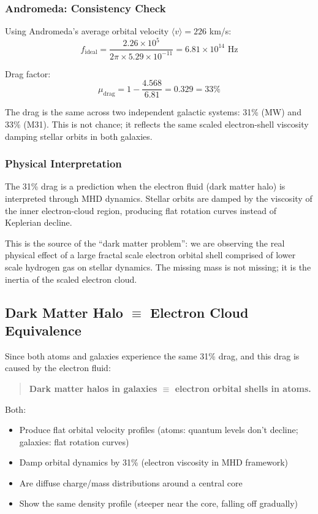 \documentclass[11pt,a4paper]{article}
\begin{document}
  \subsubsection{Andromeda: Consistency Check}

    Using Andromeda's average orbital velocity $\langle v \rangle = 226$ km/s:
    \[
    f_{\text{ideal}} = \frac{2.26 \times 10^5}{2\pi \times 5.29 \times 10^{-11}} = 6.81 \times 10^{14} \text{ Hz}
    \]

    \noindent Drag factor:
    \[
    \mu_{\text{drag}} = 1 - \frac{4.568}{6.81} = 0.329 = \boxed{33\%}
    \]

    The drag is the same across two independent galactic systems: 31\% (MW) and 33\% (M31). This is not chance; it reflects the same scaled electron-shell viscosity damping stellar orbits in both galaxies.

  \subsubsection{Physical Interpretation}

    The 31\% drag is a prediction when the electron fluid (dark matter halo) is interpreted through MHD dynamics. Stellar orbits are damped by the viscosity of the inner electron-cloud region, producing flat rotation curves instead of Keplerian decline.

    This is the source of the ``dark matter problem'': we are observing the real physical effect of a large fractal scale electron orbital shell  comprised of lower scale hydrogen gas on stellar dynamics. The missing mass is not missing; it is the inertia of the scaled electron cloud.

  \subsection{Dark Matter Halo $\equiv$ Electron Cloud Equivalence}

    Since both atoms and galaxies experience the same 31\% drag, and this drag is caused by the electron fluid:

    \begin{quote}
    \textbf{Dark matter halos in galaxies $\equiv$ electron orbital shells in atoms.}
    \end{quote}

    Both:
    \begin{itemize}
    \item Produce flat orbital velocity profiles (atoms: quantum levels don't decline; galaxies: flat rotation curves)
    \item Damp orbital dynamics by 31\% (electron viscosity in MHD framework)
    \item Are diffuse charge/mass distributions around a central core
    \item Show the same density profile (steeper near the core, falling off gradually)
    \end{itemize}
\end{document}
